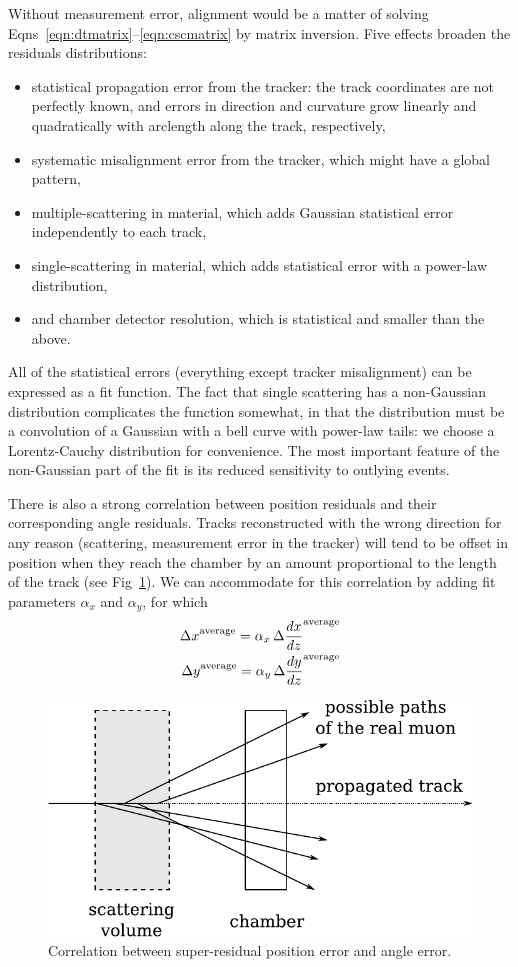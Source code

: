 \documentclass[12pt]{article}
\begin{document}
Without measurement error, alignment would be a matter of solving
Eqns~\ref{eqn:dtmatrix}--\ref{eqn:cscmatrix} by matrix inversion.
Five effects broaden the residuals distributions:
\begin{itemize}
\item statistical propagation error from the tracker: the track
  coordinates are not perfectly known, and errors in direction and
  curvature grow linearly and quadratically with arclength along the
  track, respectively,
\item systematic misalignment error from the tracker, which might have
  a global pattern,
\item multiple-scattering in material, which adds Gaussian statistical
  error independently to each track,
\item single-scattering in material, which adds statistical error with
  a power-law distribution,
\item and chamber detector resolution, which is statistical and
  smaller than the above.
\end{itemize}
All of the statistical errors (everything except tracker misalignment)
can be expressed as a fit function.  The fact that single scattering
has a non-Gaussian distribution complicates the function somewhat, in
that the distribution must be a convolution of a Gaussian with a bell
curve with power-law tails: we choose a Lorentz-Cauchy distribution
for convenience.  The most important feature of the non-Gaussian part
of the fit is its reduced sensitivity to outlying events.

There is also a strong correlation between position residuals and
their corresponding angle residuals.  Tracks reconstructed with the
wrong direction for any reason (scattering, measurement error in the
tracker) will tend to be offset in position when they reach the
chamber by an amount proportional to the length of the track (see
Fig~\ref{fig:sawtooth_diagram}).  We can accommodate for this
correlation by adding fit parameters $\alpha_x$ and $\alpha_y$, for which
\begin{eqnarray}
{\Delta x}^{\mbox{\scriptsize average}} = \alpha_x \, {\Delta \frac{dx}{dz}}^{\mbox{\scriptsize average}} \\
{\Delta y}^{\mbox{\scriptsize average}} = \alpha_y \, {\Delta \frac{dy}{dz}}^{\mbox{\scriptsize average}}
\end{eqnarray}

\begin{figure}
\begin{center} \includegraphics[height=4.5 cm]{sawtooth_diagram.pdf} \end{center}
\caption{Correlation between super-residual position error and angle error. \label{fig:sawtooth_diagram}}
\end{figure}
\end{document}
